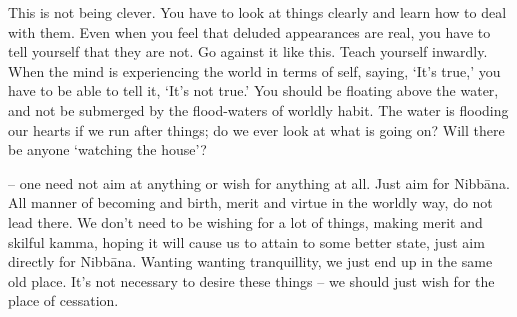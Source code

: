 This is not being clever. You have to look at things clearly and learn how to deal with them. Even when you feel that deluded appearances are real, you have to tell yourself that they are not. Go against it like this. Teach yourself inwardly. When the mind is experiencing the world in terms of self, saying, `It's true,' you have to be able to tell it, `It's not true.' You should be floating above the water, and not be submerged by the flood-waters of worldly habit. The water is flooding our hearts if we run after things; do we ever look at what is going on? Will there be anyone `watching the house'?

 -- one need not aim at anything or wish for anything at all. Just aim for Nibb\=ana. All manner of becoming and birth, merit and virtue in the worldly way, do not lead there. We don't need to be wishing for a lot of things, making merit and skilful kamma, hoping it will cause us to attain to some better state, just aim directly for Nibb\=ana. Wanting  wanting tranquillity, we just end up in the same old place. It's not necessary to desire these things -- we should just wish for the place of cessation.

